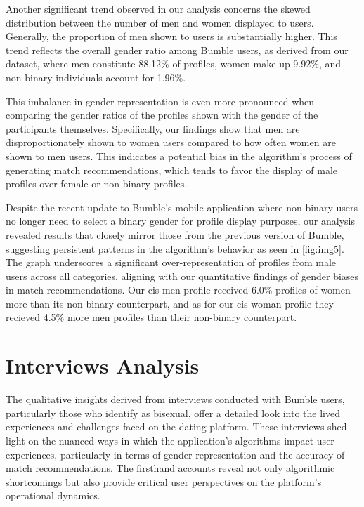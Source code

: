 Another significant trend observed in our analysis concerns the skewed distribution between the number of men and women displayed to users. Generally, the proportion of men shown to users is substantially higher. This trend reflects the overall gender ratio among Bumble users, as derived from our dataset, where men constitute 88.12\% of profiles, women make up 9.92\%, and non-binary individuals account for 1.96\%.

This imbalance in gender representation is even more pronounced when comparing the gender ratios of the profiles shown with the gender of the participants themselves. Specifically, our findings show that men are disproportionately shown to women users compared to how often women are shown to men users. This indicates a potential bias in the algorithm’s process of generating match recommendations, which tends to favor the display of male profiles over female or non-binary profiles.

Despite the recent update to Bumble’s mobile application where non-binary users no longer need to select a binary gender for profile display purposes, our analysis revealed results that closely mirror those from the previous version of Bumble, suggesting persistent patterns in the algorithm's behavior as seen in \ref{fig:img5}. The graph underscores a significant over-representation of profiles from male users across all categories, aligning with our quantitative findings of gender biases in match recommendations. Our cis-men profile received 6.0\% profiles of women more than its non-binary counterpart, and as for our cis-woman profile they recieved 4.5\% more men profiles than their non-binary counterpart.

\section{Interviews Analysis}
The qualitative insights derived from interviews conducted with Bumble users, particularly those who identify as bisexual, offer a detailed look into the lived experiences and challenges faced on the dating platform. These interviews shed light on the nuanced ways in which the application’s algorithms impact user experiences, particularly in terms of gender representation and the accuracy of match recommendations. The firsthand accounts reveal not only algorithmic shortcomings but also provide critical user perspectives on the platform's operational dynamics.

